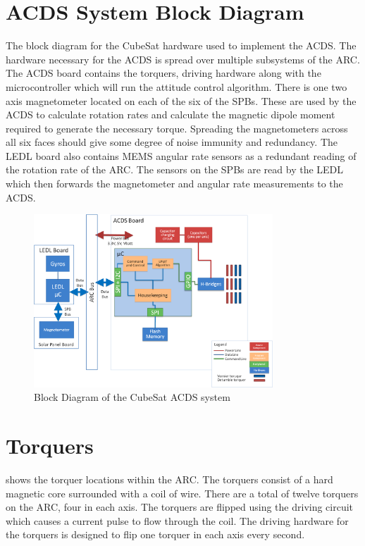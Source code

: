 \section{\acl{ACDS} System Block Diagram}

The block diagram for the CubeSat hardware used to implement the \ac{ACDS}. The hardware necessary for the \ac{ACDS} is spread over multiple subsystems of the \ac{ARC}. The \ac{ACDS} board contains the torquers, driving hardware along with the microcontroller which will run the attitude control algorithm. There is one two axis magnetometer located on each of the six of the \acp{SPB}. These are used by the \ac{ACDS} to calculate rotation rates and calculate the magnetic dipole moment required to generate the necessary torque. Spreading the magnetometers across all six faces should give some degree of noise immunity and redundancy. The \ac{LEDL} board also contains \ac{MEMS} angular rate sensors as a redundant reading of the rotation rate of the \ac{ARC}. The sensors on the \acp{SPB} are read by the \ac{LEDL} which then forwards the magnetometer and angular rate measurements to the \ac{ACDS}.

\begin{figure}[H]
    \centering
    \includegraphics[width=0.8\textwidth]{Figures/Block}
    \caption{Block Diagram of the CubeSat \acs{ACDS} system}
\end{figure}


\section{Torquers}

 shows the torquer locations within the \ac{ARC}. The torquers consist of a hard magnetic core surrounded with a coil of wire. There are a total of twelve torquers on the \ac{ARC}, four in each axis. The torquers are flipped using the driving circuit which causes a current pulse to flow through the coil. The driving hardware for the torquers is designed to flip one torquer in each axis every second.

